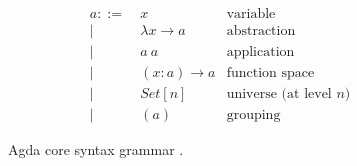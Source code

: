 \begin{figure}[h]
\begin{align*}
a ::=~& x               & \text{variable}\\
    |~& \lambda x \to a & \text{abstraction}\\
    |~& a~a             & \text{application}\\
    |~& (x : a) \to a   & \text{function space}\\
    |~& Set[n]          & \text{universe (at level $n$)}\\
    |~& (a)             & \text{grouping}
\end{align*}
\caption{Agda core syntax grammar \citep{agdawiki}.}
\label{fig:grammar}
\end{figure}
